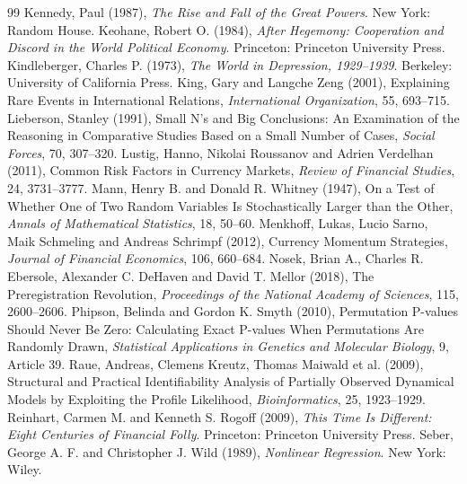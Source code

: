 \documentclass[11pt,letterpaper]{article}
\theoremstyle{definition}
\theoremstyle{plain}
\begin{document}
\begin{thebibliography}{99}
 Kennedy, Paul (1987), \emph{The Rise and Fall of the Great Powers}. New York: Random House.
 Keohane, Robert O. (1984), \emph{After Hegemony: Cooperation and Discord in the World Political Economy}. Princeton: Princeton University Press.
 Kindleberger, Charles P. (1973), \emph{The World in Depression, 1929--1939}. Berkeley: University of California Press.
 King, Gary and Langche Zeng (2001), Explaining Rare Events in International Relations, \emph{International Organization}, 55, 693--715.
 Lieberson, Stanley (1991), Small N's and Big Conclusions: An Examination of the Reasoning in Comparative Studies Based on a Small Number of Cases, \emph{Social Forces}, 70, 307--320.
 Lustig, Hanno, Nikolai Roussanov and Adrien Verdelhan (2011), Common Risk Factors in Currency Markets, \emph{Review of Financial Studies}, 24, 3731--3777.
 Mann, Henry B. and Donald R. Whitney (1947), On a Test of Whether One of Two Random Variables Is Stochastically Larger than the Other, \emph{Annals of Mathematical Statistics}, 18, 50--60.
 Menkhoff, Lukas, Lucio Sarno, Maik Schmeling and Andreas Schrimpf (2012), Currency Momentum Strategies, \emph{Journal of Financial Economics}, 106, 660--684.
 Nosek, Brian A., Charles R. Ebersole, Alexander C. DeHaven and David T. Mellor (2018), The Preregistration Revolution, \emph{Proceedings of the National Academy of Sciences}, 115, 2600--2606.
 Phipson, Belinda and Gordon K. Smyth (2010), Permutation P-values Should Never Be Zero: Calculating Exact P-values When Permutations Are Randomly Drawn, \emph{Statistical Applications in Genetics and Molecular Biology}, 9, Article 39.
 Raue, Andreas, Clemens Kreutz, Thomas Maiwald et al. (2009), Structural and Practical Identifiability Analysis of Partially Observed Dynamical Models by Exploiting the Profile Likelihood, \emph{Bioinformatics}, 25, 1923--1929.
 Reinhart, Carmen M. and Kenneth S. Rogoff (2009), \emph{This Time Is Different: Eight Centuries of Financial Folly}. Princeton: Princeton University Press.
 Seber, George A. F. and Christopher J. Wild (1989), \emph{Nonlinear Regression}. New York: Wiley.

\end{thebibliography}
\end{document}
